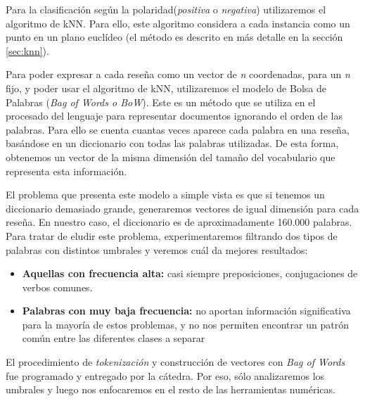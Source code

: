 Para la clasificación según la polaridad(\textit{positiva} o \textit{negativa})
utilizaremos el algoritmo de kNN.
Para ello, este algoritmo considera a cada instancia como un punto en un plano euclídeo
(el método es descrito en más detalle en la sección \ref{sec:knn}).


Para poder expresar a cada reseña como un vector de \textit{n} coordenadas,
para un \textit{n} fijo, y poder usar  el algoritmo de kNN,
utilizaremos el modelo de Bolsa de Palabras (\textit{Bag of Words o BoW}).
Este es un método que se utiliza en el procesado del lenguaje para representar
documentos ignorando el orden de las palabras. Para ello se cuenta cuantas veces aparece
cada palabra en una reseña, basándose en un diccionario con todas las palabras utilizadas.
De esta forma, obtenemos un vector de la misma
dimensión del tamaño del vocabulario que representa esta información.

El problema que presenta este modelo a simple vista es que si tenemos
un diccionario demasiado grande, generaremos vectores de igual dimensión para cada reseña.
En nuestro caso, el diccionario es de aproximadamente 160.000 palabras.
Para tratar de eludir este problema, experimentaremos filtrando
dos tipos de palabras con distintos umbrales y veremos cuál da mejores resultados:
\begin{itemize}
	\item \textbf{Aquellas con frecuencia alta:} casi siempre preposiciones, conjugaciones de verbos comunes.
	\item \textbf{Palabras con muy baja frecuencia:} no aportan información significativa para la mayoría de estos problemas, y no nos permiten encontrar un patrón común entre las diferentes clases a separar
\end{itemize}

El procedimiento de \textit{tokenización} y construcción de vectores
con \textit{Bag of Words} fue programado y entregado por la cátedra.
Por eso, sólo analizaremos los umbrales y luego nos enfocaremos en el resto de las herramientas numéricas.

